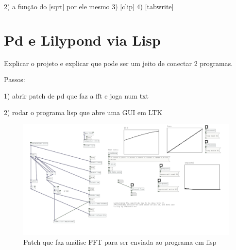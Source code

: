 \documentclass{ppgmus}
\begin{document}
2) a função do [sqrt\texttildelow] por ele mesmo
3) [clip\texttildelow]
4) [tabwrite\texttildelow]

\section{Pd e Lilypond via Lisp}

Explicar o projeto e explicar que pode ser um jeito de conectar 2 programas.

Passos:

\item 1) abrir patch de pd que faz a fft e joga num txt

\item 2) rodar o programa lisp que abre uma GUI em LTK



\begin{figure}[!ht]
\includegraphics[scale=.6]{pd-lisp1}
\caption{Patch que faz análise FFT para ser enviada ao programa em lisp}
\label{pd-lisp1}
\end{figure} 



\end{document}

